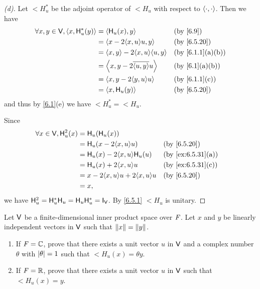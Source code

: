 \begin{proof}[(d)]
  Let \(\lt{H}_u^*\) be the adjoint operator of \(\lt{H}_u\) with respect to \(\left\langle\cdot, \cdot\right\rangle\).
  Then we have
  \begin{align*}
    \forall x, y \in \V, \inn{x, \lt{H}_u^*(y)} & = \inn{\lt{H}_u(x), y}                 &  & \by{6.9}        \\
                                                & = \inn{x - 2 \inn{x, u} u, y}          &  & \by{6.5.20}     \\
                                                & = \inn{x, y} - 2 \inn{x, u} \inn{u, y} &  & \by{6.1.1}[a,b] \\
                                                & = \inn{x, y - 2 \conj{\inn{u, y}} u}   &  & \by{6.1}[a,b]   \\
                                                & = \inn{x, y - 2 \inn{y, u} u}          &  & \by{6.1.1}[c]   \\
                                                & = \inn{x, \lt{H}_u(y)}                 &  & \by{6.5.20}
  \end{align*}
  and thus by \cref{6.1}(e) we have \(\lt{H}_u^* = \lt{H}_u\).

  Since
  \begin{align*}
    \forall x \in \V, \lt{H}_u^2(x) & = \lt{H}_u(\lt{H}_u(x))                                         \\
                                    & = \lt{H}_u(x - 2 \inn{x, u} u)           &  & \by{6.5.20}       \\
                                    & = \lt{H}_u(x) - 2 \inn{x, u} \lt{H}_u(u) &  & \by{ex:6.5.31}[a] \\
                                    & = \lt{H}_u(x) + 2 \inn{x, u} u           &  & \by{ex:6.5.31}[c] \\
                                    & = x - 2 \inn{x, u} u + 2 \inn{x, u} u    &  & \by{6.5.20}       \\
                                    & = x,
  \end{align*}
  we have \(\lt{H}_u^2 = \lt{H}_u^* \lt{H}_u = \lt{H}_u \lt{H}_u^* = \IT[\V]\).
  By \cref{6.5.1} \(\lt{H}_u\) is unitary.
\end{proof}

\begin{ex}\label{ex:6.5.32}
  Let \(\mathsf{V}\) be a finite-dimensional inner product space over \(\mathit{F}\).
  Let \(x\) and \(y\) be linearly independent vectors in \(\mathsf{V}\) such that \(\left\lVert x\right\rVert = \left\lVert y\right\rVert\).
  \begin{enumerate}
    \item If \(\mathit{F} = \mathbb{C}\), prove that there exists a unit vector \(u\) in \(\mathsf{V}\) and a complex number \(\theta\) with \(\left\lvert\theta\right\rvert = 1\) such that \(\lt{H}_u(x) = \theta y\).
    \item If \(\mathit{F} = \mathbb{R}\), prove that there exists a unit vector \(u\) in \(\mathsf{V}\) such that \(\lt{H}_u(x) = y\).
  \end{enumerate}
\end{ex}

